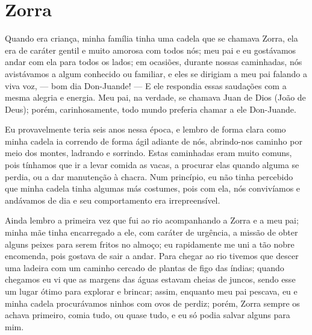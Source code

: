\cleardoublepage
\newpage
{}
\chapter{Zorra}
Quando era criança, minha família tinha uma cadela que se chamava Zorra, ela era de caráter gentil e muito amorosa com todos nós; meu pai e eu gostávamos andar com ela para todos os lados; em ocasiões, durante nossas caminhadas, nós avistávamos a algum conhecido ou familiar, e eles se dirigiam a meu pai falando a viva voz, --- bom dia Don-Juande! --- E ele respondia essas saudações com a mesma alegria e energia.
Meu pai, na verdade, se chamava Juan de Dios (João de Deus); porém, carinhosamente, todo mundo preferia chamar a ele Don-Juande.

Eu provavelmente teria seis anos nessa época, e lembro de forma clara como minha cadela ia correndo de forma ágil adiante de nós, abrindo-nos caminho por meio dos montes, ladrando e sorrindo.
Estas caminhadas eram muito comuns, pois tínhamos que ir a levar comida as vacas, a procurar elas quando alguma se perdia, ou a dar manutenção à chacra.
Num princípio, eu não tinha percebido que minha cadela tinha algumas más costumes, pois com ela, nós convivíamos e andávamos de dia e seu comportamento era irrepreensível. 

Ainda lembro a primeira vez que fui ao rio acompanhando a Zorra e a meu pai; minha mãe tinha encarregado a ele, com caráter de urgência, a missão de obter alguns peixes para serem fritos no almoço; eu rapidamente me uni a tão nobre encomenda, pois gostava de sair a andar. 
Para chegar ao rio tivemos que descer uma ladeira com um caminho cercado de plantas de figo das índias; quando chegamos eu vi que as margens das águas estavam cheias de juncos, sendo esse um lugar ótimo para explorar e brincar; assim, enquanto meu pai pescava, eu e minha cadela procurávamos ninhos com ovos de perdiz; porém, Zorra sempre os achava primeiro, comia tudo, ou quase tudo, e eu só podia salvar alguns para mim.


